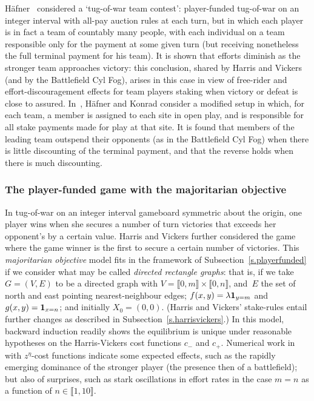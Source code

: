 \documentclass[letterpaper,11pt,oneside,reqno]{amsbook}
\numberwithin{figure}{chapter}
\theoremstyle{definition}
\theoremstyle{definition}
\theoremstyle{definition}
\theoremstyle{definition}
\theoremstyle{definition}
\newcommand{\intint}[1]{\llbracket 1,#1 \rrbracket}
\begin{document}
H\"afner~\cite{Hafner17} considered a `tug-of-war team contest': player-funded tug-of-war on an integer interval with all-pay auction rules at each turn, but in which each player is in fact a team of countably many people, with each individual on a team responsible only for the payment at some given turn (but receiving nonetheless the full terminal payment for his team). It is shown that efforts diminish as the stronger team approaches victory: this conclusion, shared by Harris and Vickers (and by the Battlefield Cyl Fog), arises in this case in view of free-rider and effort-discouragement effects for team players staking when victory or defeat is close to assured.   
In~\cite{Hafner16}, H\"afner and Konrad consider a modified setup in which, for each team, a member is assigned to each site in open play, and is responsible for all stake payments made for play at that site. It is found that members of the leading team outspend their opponents (as in the Battlefield Cyl Fog) when there is little discounting of the terminal payment, and that the reverse holds when there is much discounting.  

\medskip

\subsubsection{The player-funded game with the majoritarian objective}


In tug-of-war on an integer interval gameboard symmetric about the origin, one player wins when she secures a number of turn victories that exceeds her opponent's by a certain value. Harris and Vickers further considered the game where the game winner is the first to secure a certain number of victories.  This {\em majoritarian objective} model fits in the framework of Subsection~\ref{s.playerfunded} if we consider what may be called {\em directed rectangle graphs}: that is, 
if we take $G = (V,E)$ to be a directed graph  with $V = \llbracket 0,m \rrbracket \times \llbracket 0,n \rrbracket$, and~$E$ the set of north and east pointing nearest-neighbour edges; $f(x,y) = \lambda {\bf 1}_{y=m}$ and  $g(x,y) = {\bf 1}_{x=n}$; and initially $X_0 = (0,0)$. (Harris and Vickers' stake-rules entail further changes as described in Subsection~\ref{s.harrisvickers}.)
In this model, backward induction readily shows the equilibrium is unique under reasonable hypotheses on the Harris-Vickers cost functions $c_-$ and $c_+$.
Numerical work in~\cite{HarrisVickers87} with $z^\eta$-cost functions indicate some expected effects, such as the rapidly emerging dominance of the stronger player (the presence then of a battlefield); but also of surprises, such as stark oscillations in effort rates in the case $m=n$ as a function of $n \in \intint{10}$.
\end{document}
